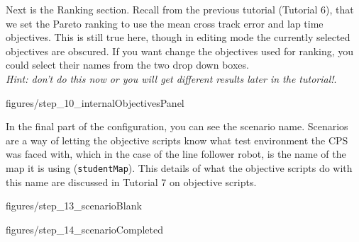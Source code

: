 \documentclass[11pt,a4paper]{../tutorial}
\begin{document}
\begin{instructions}
Next is the Ranking section.  Recall from the previous tutorial (Tutorial 6), that we set the Pareto ranking to use the mean cross track error and lap time objectives. This is still true here, though in editing mode the currently selected objectives are obscured.  If you want change the objectives used for ranking, you could select their names from the two drop down boxes. \\ \emph{Hint: don’t do this now or you will get different results later in the tutorial!}.

\begin{center}\begin{annotation}[width=0.7\linewidth,trim=0 0 0 0,clip]{figures/step_10_internalObjectivesPanel}
    \end{annotation}\end{center}

\newpage

In the final part of the configuration, you can see the scenario name. 
Scenarios are a way of letting the objective scripts know what test environment the CPS was faced with, which in the case of the line follower robot, is the name of the map it is using (\verb=studentMap=). This details of what the objective scripts do with this name are discussed in Tutorial 7 on objective scripts.



\begin{center}\begin{annotation}[width=0.7\linewidth,trim=0 0 0 0,clip]{figures/step_13_scenarioBlank}
    \end{annotation}\end{center}






\begin{center}\begin{annotation}[width=0.7\linewidth,trim=0 0 0 0,clip]{figures/step_14_scenarioCompleted}
    \end{annotation}\end{center}



\end{instructions}
\end{document}
